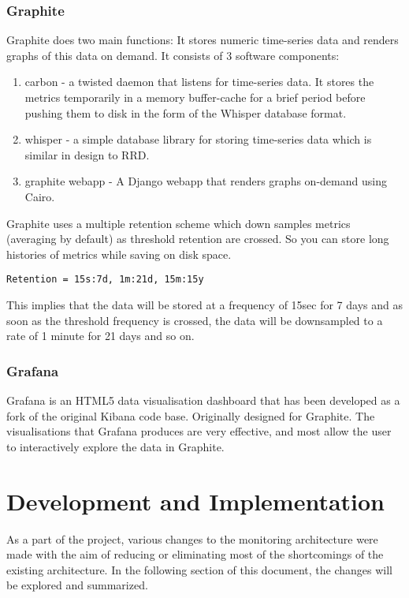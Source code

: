 \documentclass[11pt, letterpaper]{article}            %
\begin{document}
\subsubsection{Graphite}
Graphite does two main functions: It stores numeric time-series data and renders graphs of this data on demand. It consists of 3 software components:
\begin{enumerate}
	\item carbon - a twisted daemon that listens for time-series data. It stores the metrics temporarily in a memory buffer-cache for a brief period before pushing them to disk in the form of the Whisper database format.
	\item whisper - a simple database library for storing time-series data which is similar in design to RRD. 
	\item graphite webapp - A Django webapp that renders graphs on-demand using Cairo. 
\end{enumerate}
Graphite uses a multiple retention scheme which down samples metrics (averaging by default) as threshold retention are crossed. So you can store long histories of metrics while saving on disk space.
\linebreak
\begin{lstlisting}[frame=single]
                        Retention = 15s:7d, 1m:21d, 15m:15y
\end{lstlisting}
\smallskip
This implies that the data will be stored at a frequency of 15sec for 7 days and as soon as the threshold frequency is crossed, the data will be downsampled to a rate of 1 minute for 21 days and so on.


\subsubsection{Grafana}
Grafana is an HTML5 data visualisation dashboard  that has been developed as a fork of the original Kibana code base. Originally designed for Graphite. The visualisations that Grafana produces are very effective, and most allow the user to  interactively explore the data in Graphite.\citep{grafana}

\section{Development and Implementation}
As a part of the project, various changes to the monitoring architecture were made with the aim of reducing or eliminating most of the shortcomings of the existing architecture. In the following section of this document, the changes will be explored and summarized. 
\end{document}
